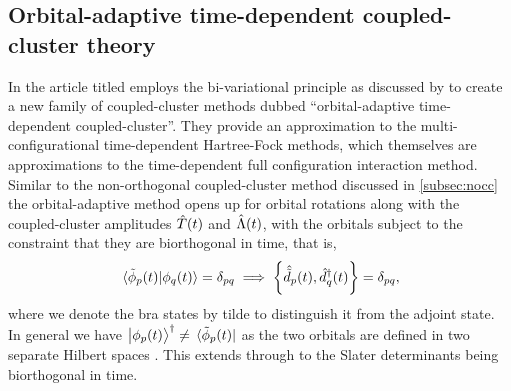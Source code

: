         \subsection{Orbital-adaptive time-dependent coupled-cluster theory}
            In the article titled 
            \citeauthor{kvaal2012ab} \cite{kvaal2012ab} employs the
            bi-variational principle as discussed by \citeauthor{arponen1983311}
            \cite{arponen1983311} to create a new family of coupled-cluster
            methods dubbed ``orbital-adaptive time-dependent
            coupled-cluster''.
            They provide an approximation to the multi-configurational
            time-dependent Hartree-Fock methods, which themselves are
            approximations to the time-dependent full configuration interaction
            method.
            Similar to the non-orthogonal coupled-cluster method discussed in
            \autoref{subsec:nocc} the orbital-adaptive method opens up for
            orbital rotations along with the coupled-cluster amplitudes
            $\hat{T}(t)$ and $\hat{\Lambda}(t)$, with the orbitals subject to the
            constraint that they are biorthogonal in time, that is,
            \begin{align}
                \braket*{\tilde{\phi}_p(t)}{\phi_q(t)} = \delta_{pq}
                \implies
                \left\{\hat{\tilde{d}}_{p}(t), \hat{d}^{\dagger}_{q}(t)\right\}
                = \delta_{pq},
            \end{align}
            where we denote the bra states by tilde to distinguish it from the
            adjoint state.
            In general we have $\ket{\phi_p(t)}^{\dagger} \neq
            \bra*{\tilde{\phi}_p(t)}$ as the two orbitals are defined in two
            separate Hilbert spaces \cite{kvaal2012ab}.
            This extends through to the Slater determinants being biorthogonal
            in time.

